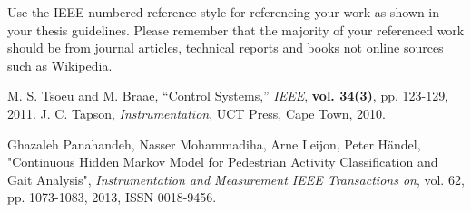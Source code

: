 Use the IEEE numbered reference style for referencing your work as shown in your thesis guidelines.
Please remember that the majority of your referenced work should be from journal articles, technical
reports and books not online sources such as Wikipedia.

\begin{thebibliography}{5}
 M. S. Tsoeu and M. Braae, ``Control Systems,'' \emph{IEEE}, {\bf vol. 34(3)}, pp. 123-129, 2011.
 J. C. Tapson, \emph{Instrumentation}, UCT Press, Cape Town, 2010.
 
 Ghazaleh Panahandeh, Nasser Mohammadiha, Arne Leijon, Peter Händel, "Continuous Hidden Markov Model for Pedestrian Activity Classification and Gait Analysis", \emph{Instrumentation and Measurement IEEE Transactions on}, vol. 62, pp. 1073-1083, 2013, ISSN 0018-9456.

\end{thebibliography}

